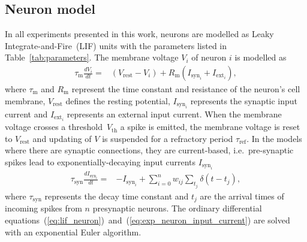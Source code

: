 \documentclass[9pt,a4paper]{amsart}
\begin{document}
\subsection{Neuron model}
\label{sec:methods/neuron_model}
In all experiments presented in this work, neurons are modelled as Leaky Integrate-and-Fire~(LIF) units with the parameters listed in Table~\ref{tab:parameters}.
The membrane voltage $V_{i}$ of neuron $i$ is modelled as
%
\begin{align}
    \tau_{\text{m}} \frac{dV_{i}}{dt} = & (V_{\text{rest}} - V_{i}) + R_{\text{m}}(I_{\text{syn}_{i}} + I_{\text{ext}_{i}}), \label{eq:lif_neuron}
\end{align}
%
where $\tau_{\text{m}}$ and $R_{\text{m}}$ represent the time constant and resistance of the neuron's cell membrane, $V_{\text{rest}}$ defines the resting potential, $I_{\text{syn}_{i}}$ represents the synaptic input current and $I_{\text{ext}_i}$ represents an external input current.
When the membrane voltage crosses a threshold~$V_{\text{th}}$ a spike is emitted, the membrane voltage is reset to $V_{\text{rest}}$ and updating of $V$ is suspended for a refractory period $\tau_{\text{ref}}$.
In the models where there are synaptic connections, they are current-based, i.e.~pre-synaptic spikes lead to exponentially-decaying input currents $I_{\text{syn}_{i}}$
%
\begin{align}
    \tau_{\text{syn}} \frac{dI_{\text{syn}_{i}}}{dt} = & -I_{\text{syn}_{i}} + \sum_{i=0}^{n} w_{ij} \sum_{t_{j}}  \delta(t - t_{j}),\label{eq:exp_neuron_input_current}
\end{align}
%
where $\tau_{\text{syn}}$ represents the decay time constant and $t_{j}$ are the arrival times of incoming spikes from $n$ presynaptic neurons.
The ordinary differential equations~(\ref{eq:lif_neuron})~and~(\ref{eq:exp_neuron_input_current}) are solved with an exponential Euler algorithm.
\end{document}

